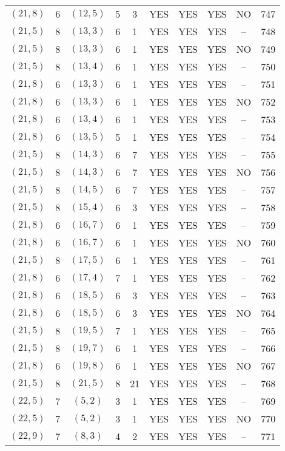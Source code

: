 \begin{longtable}{|c|c|c|c|c|c|c|c|c|c|}
$(21, 8)$ & 6 & $(12, 5)$ & 5 & 3 & YES & YES & YES & NO & 747\\
$(21, 5)$ & 8 & $(13, 3)$ & 6 & 1 & YES & YES & YES & -- & 748\\
$(21, 5)$ & 8 & $(13, 3)$ & 6 & 1 & YES & YES & YES & NO & 749\\
$(21, 5)$ & 8 & $(13, 4)$ & 6 & 1 & YES & YES & YES & -- & 750\\
$(21, 8)$ & 6 & $(13, 3)$ & 6 & 1 & YES & YES & YES & -- & 751\\
$(21, 8)$ & 6 & $(13, 3)$ & 6 & 1 & YES & YES & YES & NO & 752\\
$(21, 8)$ & 6 & $(13, 4)$ & 6 & 1 & YES & YES & YES & -- & 753\\
$(21, 8)$ & 6 & $(13, 5)$ & 5 & 1 & YES & YES & YES & -- & 754\\
$(21, 5)$ & 8 & $(14, 3)$ & 6 & 7 & YES & YES & YES & -- & 755\\
$(21, 5)$ & 8 & $(14, 3)$ & 6 & 7 & YES & YES & YES & NO & 756\\
$(21, 5)$ & 8 & $(14, 5)$ & 6 & 7 & YES & YES & YES & -- & 757\\
$(21, 5)$ & 8 & $(15, 4)$ & 6 & 3 & YES & YES & YES & -- & 758\\
$(21, 8)$ & 6 & $(16, 7)$ & 6 & 1 & YES & YES & YES & -- & 759\\
$(21, 8)$ & 6 & $(16, 7)$ & 6 & 1 & YES & YES & YES & NO & 760\\
$(21, 5)$ & 8 & $(17, 5)$ & 6 & 1 & YES & YES & YES & -- & 761\\
$(21, 8)$ & 6 & $(17, 4)$ & 7 & 1 & YES & YES & YES & -- & 762\\
$(21, 8)$ & 6 & $(18, 5)$ & 6 & 3 & YES & YES & YES & -- & 763\\
$(21, 8)$ & 6 & $(18, 5)$ & 6 & 3 & YES & YES & YES & NO & 764\\
$(21, 5)$ & 8 & $(19, 5)$ & 7 & 1 & YES & YES & YES & -- & 765\\
$(21, 5)$ & 8 & $(19, 7)$ & 6 & 1 & YES & YES & YES & -- & 766\\
$(21, 8)$ & 6 & $(19, 8)$ & 6 & 1 & YES & YES & YES & NO & 767\\
$(21, 5)$ & 8 & $(21, 5)$ & 8 & 21 & YES & YES & YES & -- & 768\\
$(22, 5)$ & 7 & $(5, 2)$ & 3 & 1 & YES & YES & YES & -- & 769\\
$(22, 5)$ & 7 & $(5, 2)$ & 3 & 1 & YES & YES & YES & NO & 770\\
$(22, 9)$ & 7 & $(8, 3)$ & 4 & 2 & YES & YES & YES & -- & 771\\

\end{longtable}
